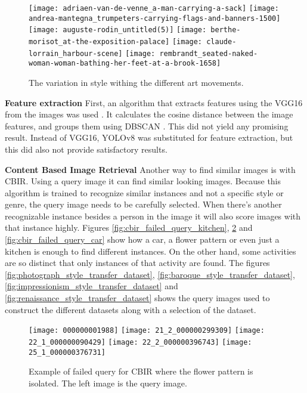 \begin{figure}
    \centering
    {
        \texttt{[image: adriaen-van-de-venne\_a-man-carrying-a-sack]}%
        \texttt{[image: andrea-mantegna\_trumpeters-carrying-flags-and-banners-1500]}%
        \texttt{[image: auguste-rodin\_untitled(5)]}%
    }
    {%
        \texttt{[image: berthe-morisot\_at-the-exposition-palace]}%
        \texttt{[image: claude-lorrain\_harbour-scene]}%
        \texttt{[image: rembrandt\_seated-naked-woman-woman-bathing-her-feet-at-a-brook-1658]}%
    }
    \caption{
        The variation in style withing the different art movements.
    }
    \label{fig:wikiart_shortcomings_style}
\end{figure}


\textbf{Feature extraction}
First, an algorithm that extracts features using the VGG16 from the images was used \cite{Roman2023}.
It calculates the cosine distance between the image features, and groups them using DBSCAN \cite{Ester1996}.
This did not yield any promising result.
Instead of VGG16, YOLOv8 \cite{Jocher_Ultralytics_YOLO_2023} was substituted for feature extraction, but this did also not provide satisfactory results.

\textbf{Content Based Image Retrieval}
Another way to find similar images is with \gls{CBIR}.
Using a query image it can find similar looking images.
Because this algorithm is trained to recognize similar instances and not a specific style or genre, the query image needs to be carefully selected.
When there's another recognizable instance besides a person in the image it will also score images with that instance highly.
Figures \ref{fig:cbir_failed_query_kitchen}, \ref{fig:cbir_failed_query_flower} and \ref{fig:cbir_failed_query_car} show how a car, a flower pattern or even just a kitchen is enough to find different instances.
On the other hand, some activities are so distinct that only instances of that activity are found.
The figures \ref{fig:photograph_style_transfer_dataset}, \ref{fig:baroque_style_transfer_dataset}, \ref{fig:impressionism_style_transfer_dataset} and \ref{fig:renaissance_style_transfer_dataset} shows the query images used to construct the different datasets along with a selection of the dataset.

\begin{figure}
    \centering
    {
        \texttt{[image: 000000001988]}%
        \texttt{[image: 21\_2\_000000299309]}%
        \texttt{[image: 22\_1\_000000090429]}%
        \texttt{[image: 22\_2\_000000396743]}%
        \texttt{[image: 25\_1\_000000376731]}%
    }
    \caption{
        Example of failed query for \gls{CBIR} where the flower pattern is isolated. The left image is the query image.
    }
    \label{fig:cbir_failed_query_flower}
\end{figure}

